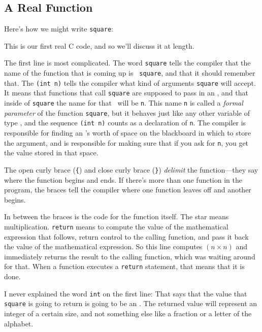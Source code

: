 \subsection{A Real Function}

Here's how we might write {\tt square}:

\begin{flushleft}
    \verb%    int square(int n)%
\\* \verb%    {%
\\* \verb%      return n*n;%
\\* \verb%    }%
\end{flushleft}

This is our first real C code, and so we'll discuss it at length.

The first line is most complicated.  The word {\tt square} tells the
compiler that the name of the function that is coming up is {\tt
square}, and that it should remember that.  The {\tt (int n)} tells the
compiler what kind of arguments {\tt square} will accept.  It means that
functions that call {\tt square} are supposed to pass in an \int, and
that inside of {\tt square} the name for that \int\ will be {\tt n}.
This name {\tt n} is called a {\em formal parameter}\/ of the function
{\tt square}, but it behaves just like any other variable of type \int,
and the sequence {\tt (int n)} counts as a declaration of {\tt n}.  The
compiler is responsible for finding an \int's worth of space on the
blackboard in which to store the argument, and is responsible for making
sure that if you ask for {\tt n}, you get the value stored in that
space.

The open curly brace ({\tt\{}) and close curly brace ({\tt\}}) {\em
delimit}\/ the function---they say where the function begins and ends.
If there's more than one function in the program, the braces tell the
compiler where one function leaves off and another begins.

In between the braces is the code for the function itself.  The star
{\tt *} means multiplication.  {\tt return} means to compute the value
of the mathematical expression that follows, return control to the
calling function, and pass it back the value of the mathematical
expression.  So this line computes $(n\times n)$ and immediately returns
the result to the calling function, which was waiting around for that.
When a function executes a {\tt return} statement, that means that it is
done.

I never explained the word {\tt int} on the first line: That says that
the value that {\tt square} is going to return is going to be an \int.
The returned value will represent an integer of a certain size, and not
something else like a fraction or a letter of the alphabet.

